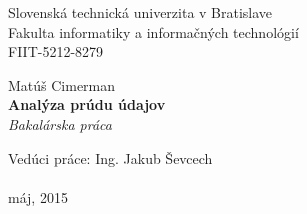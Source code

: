 \documentclass[12pt, a4paper, titlepage, slovak]{book}
\begin{document}
\sloppy %




\frontmatter

\begin{titlepage}
\begin{center}                                                                                                                                                   
{\Large Slovenská technická univerzita v Bratislave} \\
{\Large Fakulta informatiky a informačných technológií} \\
\vspace*{1\baselineskip}
\large {FIIT-5212-8279}
\vfill %


{{Matúš Cimerman}} \\
\vspace*{1\baselineskip}
{\huge {\textbf{Analýza prúdu údajov}}} %
\\
\vspace*{1\baselineskip}
\textit{Bakalárska práca}\\
\vfill %
\end{center}
{Vedúci práce: Ing. Jakub Ševcech}\\
\\
{máj, 2015}
\end{titlepage}
\emptydoublepage
\end{document}
